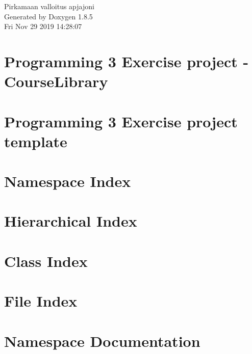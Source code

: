 \documentclass[twoside]{book}
\newcommand{\clearemptydoublepage}{%
  \newpage{\pagestyle{empty}\cleardoublepage}%
}
\begin{document}
\hypersetup{pageanchor=false}
\begin{titlepage}
\vspace*{7cm}
\begin{center}%
{\Large Pirkamaan valloitus apjajoni }\\
\vspace*{1cm}
{\large Generated by Doxygen 1.8.5}\\
\vspace*{0.5cm}
{\small Fri Nov 29 2019 14:28:07}\\
\end{center}
\end{titlepage}
\clearemptydoublepage
\tableofcontents
\clearemptydoublepage
{}
\hypersetup{pageanchor=true}

\chapter{Programming 3 Exercise project -\/ Course\-Library}
\label{md_Course_README}
\hypertarget{md_Course_README}{}

\chapter{Programming 3 Exercise project template}
\label{md_README}
\hypertarget{md_README}{}

\chapter{Namespace Index}

\chapter{Hierarchical Index}

\chapter{Class Index}

\chapter{File Index}

\chapter{Namespace Documentation}





\end{document}
